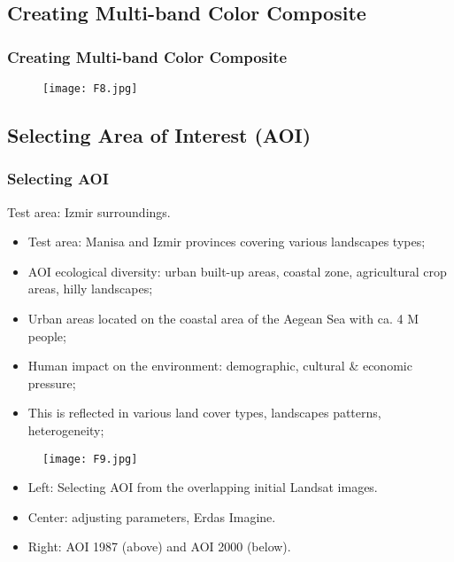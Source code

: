 \documentclass[pdflatex,compress,8pt,
	xcolor={dvipsnames,dvipsnames,svgnames,x11names,table},
	hyperref={colorlinks = true,
	breaklinks = true, 
	urlcolor = NavyBlue, 
	breaklinks = true}]{beamer}
\begin{document}
\subsection{Creating Multi-band Color Composite}
\begin{frame}\frametitle{Creating Multi-band Color Composite}
\begin{figure}[H]
	\centering
		\texttt{[image: F8.jpg]}
\end{figure}
\end{frame}

\subsection{Selecting Area of Interest (AOI)}
\begin{frame}\frametitle{Selecting AOI}
Test area: Izmir surroundings.
\begin{itemize}
	\item Test area: Manisa and Izmir provinces covering various landscapes types;
	\item AOI ecological diversity: urban built-up areas, coastal zone, agricultural crop areas, hilly landscapes;
	\item Urban areas located on the coastal area of the Aegean Sea with ca. 4 M people;
	\item Human impact on the environment: demographic, cultural \& economic pressure;
	\item This is reflected in various land cover types, landscapes patterns, heterogeneity;
\end{itemize}
\begin{figure}[H]
	\centering
		\texttt{[image: F9.jpg]}
\end{figure}
\begin{itemize}
	\item Left: Selecting AOI from the overlapping initial Landsat images. 
	\item Center: adjusting parameters, Erdas Imagine.
	\item Right: AOI 1987 (above) and AOI 2000 (below).
\end{itemize}
\end{frame}
\end{document}
